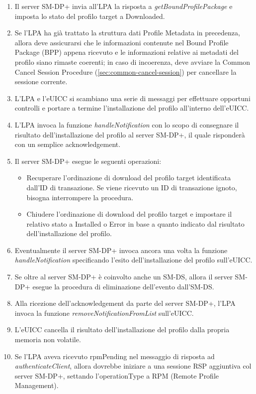 \documentclass[10pt, oneside]{book}
\begin{document}
\begin{enumerate}
\item Il server SM-DP+ invia all'LPA la risposta a \textit{getBoundProfilePackage} e imposta lo stato del profilo target a Downloaded.
\item Se l'LPA ha già trattato la struttura dati Profile Metadata in precedenza, allora deve assicurarsi che le informazioni contenute nel Bound Profile Package (BPP) appena ricevuto e le informazioni relative ai metadati del profilo siano rimaste coerenti; in caso di incoerenza, deve avviare la Common Cancel Session Procedure (\ref{sec:common-cancel-session}) per cancellare la sessione corrente.
\item L'LPA e l'eUICC si scambiano una serie di messaggi per effettuare opportuni controlli e portare a termine l'installazione del profilo all'interno dell'eUICC.
\item L'LPA invoca la funzione \textit{handleNotification} con lo scopo di consegnare il risultato dell'installazione del profilo al server SM-DP+, il quale risponderà con un semplice acknowledgement.
\item Il server SM-DP+ esegue le seguenti operazioni:
\begin{itemize}[itemsep=0pt]
\item Recuperare l'ordinazione di download del profilo target identificata dall'ID di transazione. Se viene ricevuto un ID di transazione ignoto, bisogna interrompere la procedura.
\item Chiudere l'ordinazione di download del profilo target e impostare il relativo stato a Installed o Error in base a quanto indicato dal risultato dell'installazione del profilo.
\end{itemize}
\item Eventualmente il server SM-DP+ invoca ancora una volta la funzione \textit{handleNotification} specificando l'esito dell'installazione del profilo sull'eUICC.
\item Se oltre al server SM-DP+ è coinvolto anche un SM-DS, allora il server SM-DP+ esegue la procedura di eliminazione dell'evento dall'SM-DS.
\item Alla ricezione dell'acknowledgement da parte del server SM-DP+, l'LPA invoca la funzione \textit{removeNotificationFromList} sull'eUICC.
\item L'eUICC cancella il risultato dell'installazione del profilo dalla propria memoria non volatile.
\item Se l'LPA aveva ricevuto rpmPending nel messaggio di risposta ad \textit{authenticateClient}, allora dovrebbe iniziare a una sessione RSP aggiuntiva col server SM-DP+, settando l'operationType a RPM (Remote Profile Management).
\end{enumerate}
\end{document}
